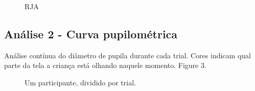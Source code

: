 \documentclass{article}
\begin{document}
\begin{figure}[t]
\caption{RJA}
\noindent{}
\centering
\end{figure}

\subsection{Análise 2 - Curva pupilométrica}

Análise contínua do diâmetro de pupila durante cada trial. Cores indicam qual parte da tela a criança está olhando naquele momento. Figure 3.

\begin{figure}[t]
\caption{Um participante, dividido por trial.}
\noindent{}
\centering
\end{figure}
\end{document}
